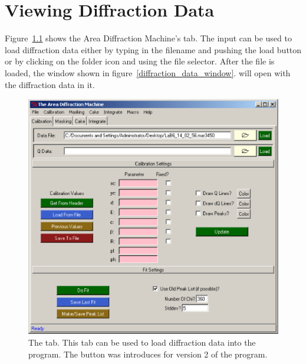 \chapter{Viewing Diffraction Data}\label{viewing_data}

Figure~\ref{calibration_tab} shows the 
Area Diffraction Machine's  tab. 
The  input can be 
used to load diffraction data either by typing in the filename 
and pushing the load button or by clicking on the folder icon and
using the file selector. After the file is loaded, 
the window shown in figure~\ref{diffraction_data_window}.
will open with the diffraction data in it. 

\begin{figure}
    \centering
    \includegraphics[scale=.75]
    {figures/calibration_tab.eps}
    \caption{The  tab. This tab can be used
    to load diffraction data into the program. The 
     button was introduces for version 2 of
    the program.} 
    \label{calibration_tab}
\end{figure}

